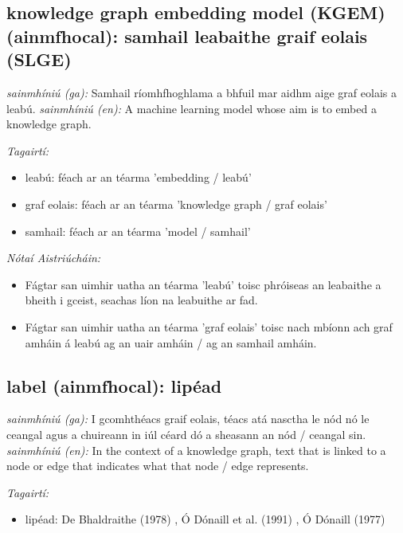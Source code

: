 \documentclass{article}
\begin{document}
\subsection*{knowledge graph embedding model (KGEM) (ainmfhocal): samhail leabaithe graif eolais (SLGE)} 
 \noindent \textit{sainmhíniú (ga):} Samhail ríomhfhoghlama a bhfuil mar aidhm aige graf eolais a leabú.
\newline\newline
 \noindent \textit{sainmhíniú (en):} A machine learning model whose aim is to embed a knowledge graph.
\newline

 \noindent \textit{Tagairtí:}
\begin{itemize}
	\item leabú: féach ar an téarma 'embedding / leabú'
	\item graf eolais: féach ar an téarma 'knowledge graph / graf eolais'
	\item samhail: féach ar an téarma 'model / samhail'
\end{itemize}

 \noindent \textit{Nótaí Aistriúcháin:}
\begin{itemize}
	\item Fágtar san uimhir uatha an téarma 'leabú' toisc phróiseas an leabaithe a bheith i gceist, seachas líon na leabuithe ar fad.
	\item Fágtar san uimhir uatha an téarma 'graf eolais' toisc nach mbíonn ach graf amháin á leabú ag an uair amháin / ag an samhail amháin.
\end{itemize}


\subsection*{label (ainmfhocal): lipéad} 
 \noindent \textit{sainmhíniú (ga):} I gcomhthéacs graif eolais, téacs atá nasctha le nód nó le ceangal agus a chuireann in iúl céard dó a sheasann an nód / ceangal sin.
\newline\newline
 \noindent \textit{sainmhíniú (en):} In the context of a knowledge graph, text that is linked to a node or edge that indicates what that node / edge represents.
\newline

 \noindent \textit{Tagairtí:}
\begin{itemize}
	\item lipéad: De Bhaldraithe (1978) \cite{de-bhaldraithe}, Ó Dónaill et al. (1991) \cite{focloir-beag}, Ó Dónaill (1977) \cite{odonaill}
\end{itemize}
\end{document}
